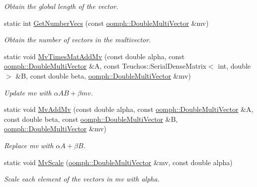 \begin{DoxyCompactItemize}
\begin{DoxyCompactList}\small\item\em Obtain the global length of the vector. \end{DoxyCompactList}\item 
static int \hyperlink{classAnasazi_1_1MultiVecTraits_3_01double_00_01oomph_1_1DoubleMultiVector_01_4_abb5e3e3825dc16a80d83a424d154db8c}{Get\+Number\+Vecs} (const \hyperlink{classoomph_1_1DoubleMultiVector}{oomph\+::\+Double\+Multi\+Vector} \&mv)
\begin{DoxyCompactList}\small\item\em Obtain the number of vectors in the multivector. \end{DoxyCompactList}\item 
static void \hyperlink{classAnasazi_1_1MultiVecTraits_3_01double_00_01oomph_1_1DoubleMultiVector_01_4_a41445251a1d0c052e1b24f4b75abbe41}{Mv\+Times\+Mat\+Add\+Mv} (const double alpha, const \hyperlink{classoomph_1_1DoubleMultiVector}{oomph\+::\+Double\+Multi\+Vector} \&A, const Teuchos\+::\+Serial\+Dense\+Matrix$<$ int, double $>$ \&B, const double beta, \hyperlink{classoomph_1_1DoubleMultiVector}{oomph\+::\+Double\+Multi\+Vector} \&mv)
\begin{DoxyCompactList}\small\item\em Update {\ttfamily mv} with $ \alpha AB + \beta mv $. \end{DoxyCompactList}\item 
static void \hyperlink{classAnasazi_1_1MultiVecTraits_3_01double_00_01oomph_1_1DoubleMultiVector_01_4_aaebfcc1897c825815e9dbd4a3939cb0c}{Mv\+Add\+Mv} (const double alpha, const \hyperlink{classoomph_1_1DoubleMultiVector}{oomph\+::\+Double\+Multi\+Vector} \&A, const double beta, const \hyperlink{classoomph_1_1DoubleMultiVector}{oomph\+::\+Double\+Multi\+Vector} \&B, \hyperlink{classoomph_1_1DoubleMultiVector}{oomph\+::\+Double\+Multi\+Vector} \&mv)
\begin{DoxyCompactList}\small\item\em Replace {\ttfamily mv} with $\alpha A + \beta B$. \end{DoxyCompactList}\item 
static void \hyperlink{classAnasazi_1_1MultiVecTraits_3_01double_00_01oomph_1_1DoubleMultiVector_01_4_a9e9e082eb66b9a5e31232de7df06a36d}{Mv\+Scale} (\hyperlink{classoomph_1_1DoubleMultiVector}{oomph\+::\+Double\+Multi\+Vector} \&mv, const double alpha)
\begin{DoxyCompactList}\small\item\em Scale each element of the vectors in {\ttfamily mv} with {\ttfamily alpha}. \end{DoxyCompactList}\item 

\end{DoxyCompactItemize}

